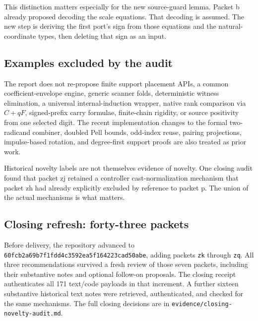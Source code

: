 \documentclass[11pt,letterpaper]{article}
\newcommand{\code}[1]{{\small\urlstyle{tt}\nolinkurl{#1}}}
\begin{document}
This distinction matters especially for the new source-guard lemma. Packet b already proposed decoding the scale equations. That decoding is assumed. The new step is deriving the first port's sign from those equations and the natural-coordinate types, then deleting that sign as an input.

\subsection{Examples excluded by the audit}

The report does not re-propose finite support placement APIs, a common coefficient-envelope engine, generic scanner folds, deterministic witness elimination, a universal internal-induction wrapper, native rank comparison via $C+qF$, signed-prefix carry formulae, finite-chain rigidity, or source positivity from one selected digit. The recent implementation changes to the formal two-radicand combiner, doubled Pell bounds, odd-index reuse, pairing projections, impulse-based rotation, and degree-first support proofs are also treated as prior work.

Historical novelty labels are not themselves evidence of novelty. One closing audit found that packet zj retained a controller cast-normalization mechanism that packet zh had already explicitly excluded by reference to packet p. The union of the actual mechanisms is what matters.

\subsection{Closing refresh: forty-three packets}

Before delivery, the repository advanced to
\code{60fcb2a69b7f1fdd4c3592ea5f164223cad50abe}, adding packets
\code{zk} through \code{zq}. All three recommendations survived a fresh
review of those seven packets, including their substantive notes and optional
follow-on proposals. The closing receipt authenticates all 171 text/code
payloads in that increment. A further sixteen substantive historical text
notes were retrieved, authenticated, and checked for the same mechanisms.
The full closing decisions are in \code{evidence/closing-novelty-audit.md}.
\end{document}
